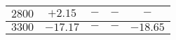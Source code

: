 \documentclass{beamer}
\begin{document}
\begin{frame}
  \begin{table}
    \begin{tabular}{|c|c|c|c|c|}
        \hline
      $2800$ & $+2.15$ & $-$ & $-$ & $-$\\
      \hline
      $3300$ & $-17.17$ & $-$ & $-$ & $-18.65$\\
      \hline
    \end{tabular}
  \end{table}
\end{frame}
\end{document}
